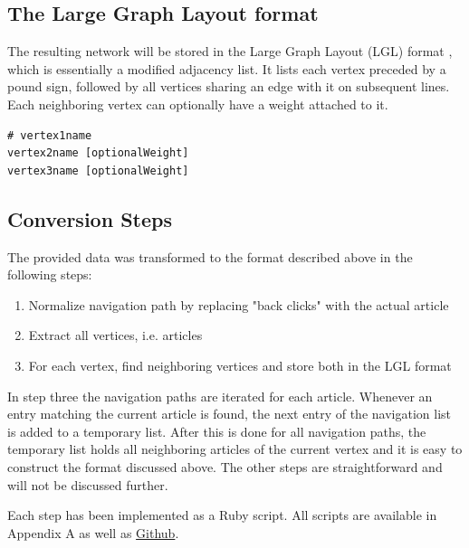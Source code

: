\documentclass{article}\usepackage[]{graphicx}\usepackage[]{color}
\begin{document}
\subsection{The Large Graph Layout format}
The resulting network will be stored in the Large Graph Layout (LGL) format \cite{lgl}, which is essentially a modified adjacency list. It lists each vertex preceded by a pound sign, followed by all vertices sharing an edge with it on subsequent lines. Each neighboring vertex can optionally have a weight attached to it.

\begin{lstlisting}[title=LGL format example ]
# vertex1name
vertex2name [optionalWeight]
vertex3name [optionalWeight]
\end{lstlisting}


\subsection{Conversion Steps}

The provided data was transformed to the format described above in the following steps:

\begin{enumerate}
\item Normalize navigation path by replacing "back clicks" with the actual article
\item Extract all vertices, i.e. articles
\item For each vertex, find neighboring vertices and store both in the LGL format 
\end{enumerate}

In step three the navigation paths are iterated for each article. Whenever an entry matching the current article is found, the next entry of the navigation list is added to a temporary list. After this is done for all navigation paths, the temporary list holds all neighboring articles of the current vertex and it is easy to construct the format discussed above. The other steps are straightforward and will not be discussed further.

Each step has been implemented as a Ruby script. All scripts are available in Appendix A as well as \href{https://github.com/t-obi/computational-network-analysis/tree/master/project/wikispeedia_paths-and-graph}{Github}.
\end{document}
